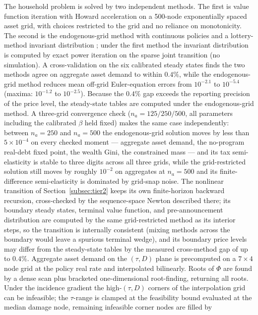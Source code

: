 \documentclass[12pt]{article}
\begin{document}
The household problem is solved by two independent methods. The first is
value function iteration with Howard acceleration on a 500-node
exponentially spaced asset grid, with choices restricted to the grid and no
reliance on monotonicity. The second is the endogenous-grid method
\citep{carroll2006egm} with continuous policies and a lottery-method
invariant distribution \citep{young2010}; under the first method the
invariant distribution is computed by exact power iteration on the sparse
joint transition (no simulation). A cross-validation on the six calibrated
steady states finds the two methods agree on aggregate asset demand to
within $0.4\%$, while the endogenous-grid method reduces mean off-grid
Euler-equation errors from $10^{-2.1}$ to $10^{-5.4}$ (maxima: $10^{-1.2}$
to $10^{-2.5}$). Because the $0.4\%$ gap exceeds the reporting precision of
the price level, the steady-state tables are computed under the
endogenous-grid method. A three-grid convergence check
($n_a=125/250/500$, all parameters including the calibrated $\beta$ held
fixed) makes the same case independently: between $n_a=250$ and $n_a=500$
the endogenous-grid solution moves by less than $5\times10^{-4}$ on every
checked moment --- aggregate asset demand, the no-program real-debt fixed
point, the wealth Gini, the constrained mass --- and its tax
semi-elasticity is stable to three digits across all three grids, while
the grid-restricted solution still moves by roughly $10^{-2}$ on
aggregates at $n_a=500$ and its finite-difference semi-elasticity is
dominated by grid-snap noise. The nonlinear transition of
Section~\ref{subsec:tier2} keeps its own finite-horizon backward recursion,
cross-checked by the sequence-space Newton described there; its boundary
steady states, terminal value function, and pre-announcement distribution
are computed by the same grid-restricted method as its interior steps, so
the transition is internally consistent (mixing methods across the
boundary would leave a spurious terminal wedge), and its boundary price
levels may differ from the steady-state tables by the measured
cross-method gap of up to $0.4\%$. Aggregate asset demand on the $(\tau,D)$ plane is precomputed on a
$7\times4$ node grid at the policy real rate and interpolated bilinearly.
Roots of $\Phi$ are found by a dense
scan plus bracketed one-dimensional root-finding, returning all roots.
Under the incidence
gradient the high-$(\tau,D)$ corners of the interpolation grid can be
infeasible; the $\tau$-range is clamped at the feasibility bound evaluated at
the median damage node, remaining infeasible corner nodes are filled by
\end{document}
